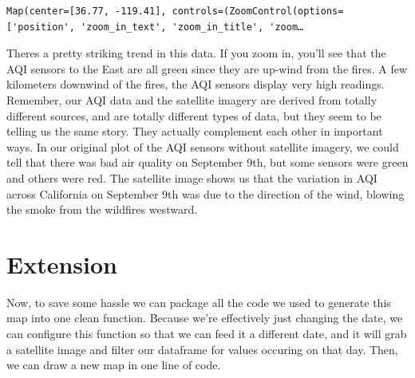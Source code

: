 \documentclass[
  letterpaper,
  DIV=11,
  numbers=noendperiod]{scrreprt}
\begin{document}
\begin{verbatim}
Map(center=[36.77, -119.41], controls=(ZoomControl(options=['position', 'zoom_in_text', 'zoom_in_title', 'zoom…
\end{verbatim}

Theres a pretty striking trend in this data. If you zoom in, you'll see
that the AQI sensors to the East are all green since they are up-wind
from the fires. A few kilometers downwind of the fires, the AQI sensors
display very high readings. Remember, our AQI data and the satellite
imagery are derived from totally different sources, and are totally
different types of data, but they seem to be telling us the same story.
They actually complement each other in important ways. In our original
plot of the AQI sensors without satellite imagery, we could tell that
there was bad air quality on September 9th, but some sensors were green
and others were red. The satellite image shows us that the variation in
AQI across California on September 9th was due to the direction of the
wind, blowing the smoke from the wildfires westward.

\hypertarget{extension-1}{%
\section{Extension}\label{extension-1}}

Now, to save some hassle we can package all the code we used to generate
this map into one clean function. Because we're effectively just
changing the date, we can configure this function so that we can feed it
a different date, and it will grab a satellite image and filter our
dataframe for values occuring on that day. Then, we can draw a new map
in one line of code.
\end{document}
